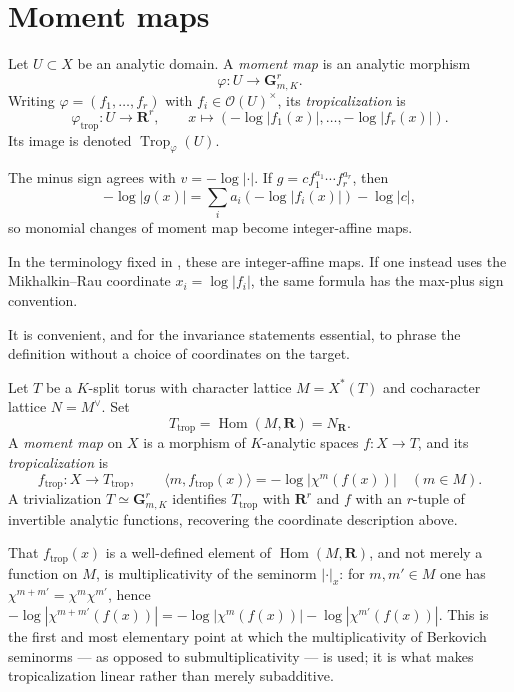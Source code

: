 \section{Moment maps}
\label{sec:trop-moment}

\begin{definition}
\label{def:trop-moment-map}
Let $U\subset X$ be an analytic domain. A \emph{moment map} is an analytic
morphism
\[
                         \varphi:U\longrightarrow\mathbf G_{m,K}^r.
\]
Writing $\varphi=(f_1,\ldots,f_r)$ with $f_i\in\mathcal O(U)^\times$, its
\emph{tropicalization} is
\[
\varphi_{\mathrm{trop}}:U\longrightarrow\mathbf R^r,\qquad
x\longmapsto(-\log|f_1(x)|,\ldots,-\log|f_r(x)|).
\]
Its image is denoted $\operatorname{Trop}_\varphi(U)$.
\end{definition}

The minus sign agrees with $v=-\log|\cdot|$. If
$g=c f_1^{a_1}\cdots f_r^{a_r}$, then
\[
                         -\log|g(x)|
=\sum_i a_i(-\log|f_i(x)|)-\log|c|,
\]
so monomial changes of moment map become integer-affine maps.

In the terminology fixed in , these are
integer-affine maps.  If one instead uses the Mikhalkin--Rau coordinate
$x_i=\log|f_i|$, the same formula has the max-plus sign convention.

It is convenient, and for the invariance statements essential, to phrase the
definition without a choice of coordinates on the target.

\begin{definition}
\label{def:trop-moment-invariant}
Let $T$ be a $K$-split torus with character lattice $M=X^*(T)$ and
cocharacter lattice $N=M^\vee$. Set
\[
 T_{\mathrm{trop}}=\operatorname{Hom}(M,\mathbf R)=N_{\mathbf R}.
\]
A \emph{moment map} on $X$ is a morphism of $K$-analytic spaces
$f:X\to T$, and its \emph{tropicalization} is
\[
 f_{\mathrm{trop}}:X\longrightarrow T_{\mathrm{trop}},
 \qquad
 \langle m,f_{\mathrm{trop}}(x)\rangle=-\log\bigl|\chi^m(f(x))\bigr|
 \quad(m\in M).
\]
A trivialization $T\simeq\mathbf G_{m,K}^r$ identifies
$T_{\mathrm{trop}}$ with $\mathbf R^r$ and $f$ with an $r$-tuple of
invertible analytic functions, recovering the coordinate description above.
\end{definition}

That $f_{\mathrm{trop}}(x)$ is a well-defined element of
$\operatorname{Hom}(M,\mathbf R)$, and not merely a function on $M$, is
multiplicativity of the seminorm $|\cdot|_x$: for $m,m'\in M$ one has
$\chi^{m+m'}=\chi^m\chi^{m'}$, hence
$-\log|\chi^{m+m'}(f(x))|=-\log|\chi^m(f(x))|-\log|\chi^{m'}(f(x))|$.
This is the first and most elementary point at which the multiplicativity of
Berkovich seminorms --- as opposed to submultiplicativity --- is used; it is
what makes tropicalization linear rather than merely subadditive.

